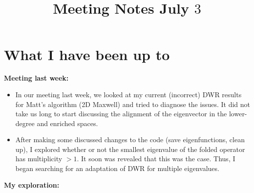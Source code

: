 \documentclass[12pt,a4paper]{article}
\title{Meeting Notes July $3$}
\author{}
\date{}
\begin{document}
\maketitle

\section{What I have been up to}

\textbf{Meeting last week:}
\begin{itemize}
    \item In our meeting last week, we looked at my current (incorrect) DWR results for Matt's algorithm (2D Maxwell) and tried to diagnose the issues. It did not take us long to start discussing the alignment of the eigenvector in the lower-degree and enriched spaces. 

    \item After making some discussed changes to the code (save eigenfunctions, clean up), I explored whether or not the smallest eigenvalue of the folded operator has multiplicity $> 1.$ It soon was revealed that this was the case. Thus, I began searching for an adaptation of DWR for multiple eigenvalues.
\end{itemize}


\textbf{My exploration:}
\end{document}
